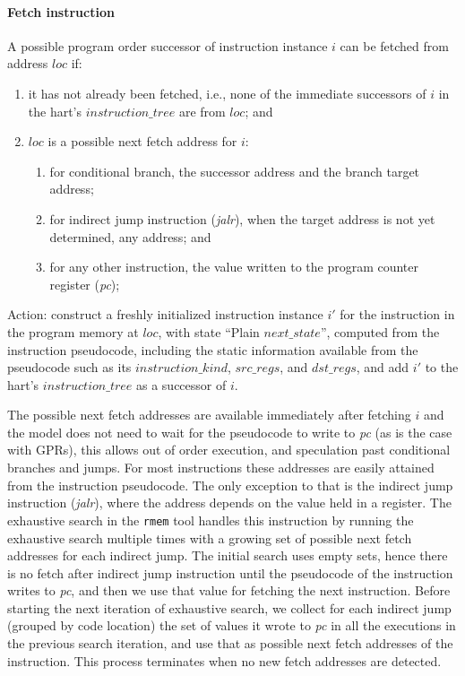 \paragraph{Fetch instruction}\label{omm:fetch}
A possible program order successor of instruction instance $i$ can be fetched from address $loc$ if:
\begin{enumerate}
\item it has not already been fetched, i.e., none of the immediate successors of $i$ in the hart's $instruction\_tree$ are from $loc$; and
\item $loc$ is a possible next fetch address for $i$:
  \begin{enumerate}
  \item for conditional branch, the successor address and the branch target address;
  \item for indirect jump instruction ({\em jalr}), when the target address is not yet determined, any address; and
  \item for any other instruction, the value written to the program counter register ({\em pc});
  \end{enumerate}
\end{enumerate}


Action: construct a freshly initialized instruction instance $i'$ for the instruction in the program memory at $loc$, with state ``{\sc Plain} $next\_state$'', computed from the instruction pseudocode, including the static information available from the pseudocode such as its $instruction\_kind$, $src\_regs$, and $dst\_regs$, and add $i'$ to the hart's $instruction\_tree$ as a successor of $i$.

\begin{commentary}
The possible next fetch addresses are available immediately after fetching $i$ and the model does not need to wait for the pseudocode to write to {\em pc} (as is the case with GPRs), this allows out of order execution, and speculation past conditional branches and jumps.
For most instructions these addresses are easily attained from the instruction pseudocode.
The only exception to that is the indirect jump instruction ({\em jalr}), where the address depends on the value held in a register.
%
The exhaustive search in the {\tt rmem} tool handles this instruction by running the exhaustive search multiple times with a growing set of possible next fetch addresses for each indirect jump.
The initial search uses empty sets, hence there is no fetch after indirect jump instruction until the pseudocode of the instruction writes to {\em pc}, and then we use that value for fetching the next instruction.
Before starting the next iteration of exhaustive search, we collect for each indirect jump (grouped by code location) the set of values it wrote to {\em pc} in all the executions in the previous search iteration, and use that as possible next fetch addresses of the instruction.
This process terminates when no new fetch addresses are detected.
\end{commentary}


